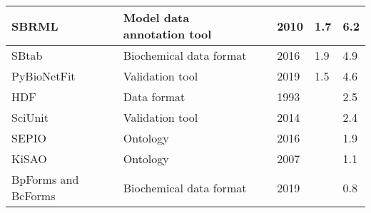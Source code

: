 \begin{longtable}{ |m{2.2cm}|m{5cm}|m{1.2cm}|m{1cm}|m{1.2cm}|m{1cm}| }
\hline
\small{SBRML} &\small{Model data annotation tool} &\cite{Dada2010SBRML:Models} &\small{2010} &\small{1.7} &\small{6.2}\\
\hline
\small{SBtab} &\small{Biochemical data format} &\cite{Lubitz2016SBtab:Biology} &\small{2016} &\small{1.9} &\small{4.9}\\
\hline
\small{PyBioNetFit} &\small{Validation tool} &\cite{Mitra2019PyBioNetFitLanguage} &\small{2019} &\small{1.5} &\small{4.6}\\
\hline
\small{HDF} &\small{Data format} &\cite{Brown1993SoftwareManagement} &\small{1993} &\small{} &\small{2.5}\\
\hline
\small{SciUnit} &\small{Validation tool} &\cite{Omar2014CollaborativeValidation} &\small{2014} &\small{} &\small{2.4}\\
\hline
\small{SEPIO} &\small{Ontology} &\cite{Brush2016SEPIO:Evidence} &\small{2016} &\small{} &\small{1.9}\\
\hline
\small{KiSAO} &\small{Ontology} &\cite{Zhukova2011KineticOntology} &\small{2007} &\small{} &\small{1.1}\\
\hline
\small{BpForms and BcForms} &\small{Biochemical data format} &\cite{Lang2019BpForms:Proteins} &\small{2019} &\small{} &\small{0.8}\\
\hline
\end{longtable}
